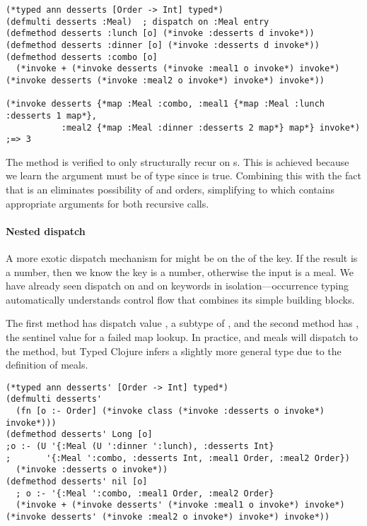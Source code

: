 \begin{exmp}
\begin{lstlisting}
(*typed ann desserts [Order -> Int] typed*)
(defmulti desserts :Meal)  ; dispatch on :Meal entry
(defmethod desserts :lunch [o] (*invoke :desserts d invoke*))
(defmethod desserts :dinner [o] (*invoke :desserts d invoke*))
(defmethod desserts :combo [o] 
  (*invoke + (*invoke desserts (*invoke :meal1 o invoke*) invoke*) (*invoke desserts (*invoke :meal2 o invoke*) invoke*) invoke*))

(*invoke desserts {*map :Meal :combo, :meal1 {*map :Meal :lunch :desserts 1 map*}, 
           :meal2 {*map :Meal :dinner :desserts 2 map*} map*} invoke*) ;=> 3
\end{lstlisting}
\label{example:desserts-on-meal}
\end{exmp}
%
The  method is verified to only structurally recur
on s. This is achieved because we learn the argument  must
be of type
since
is true. Combining this
with the fact that  is an 
eliminates possibility of  and 
orders, simplifying  to
which contains appropriate arguments for both recursive calls.

\paragraph{Nested dispatch}
A more exotic dispatch mechanism for 
might be on the  of the  key.
If the result is a number, then we know the 
key is a number, otherwise the input is a  meal.
We have already seen dispatch on  and on keywords
in isolation---occurrence typing automatically understands
control flow that combines its simple building blocks.

The first method has dispatch value , a subtype
of , and the second method has , the sentinel value for a failed map lookup.
In practice,  and  meals will dispatch to the 
method, but Typed Clojure infers a slightly more general type due to the definition
of  meals.

\begin{exmp}
\begin{lstlisting}
(*typed ann desserts' [Order -> Int] typed*)
(defmulti desserts' 
  (fn [o :- Order] (*invoke class (*invoke :desserts o invoke*) invoke*)))
(defmethod desserts' Long [o] 
;o :- (U '{:Meal (U ':dinner ':lunch), :desserts Int}
;       '{:Meal ':combo, :desserts Int, :meal1 Order, :meal2 Order})
  (*invoke :desserts o invoke*))
(defmethod desserts' nil [o]
  ; o :- '{:Meal ':combo, :meal1 Order, :meal2 Order}
  (*invoke + (*invoke desserts' (*invoke :meal1 o invoke*) invoke*) (*invoke desserts' (*invoke :meal2 o invoke*) invoke*) invoke*))
\end{lstlisting}
\label{example:desserts-on-class}
\end{exmp}
%

